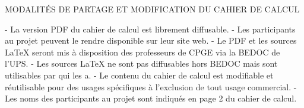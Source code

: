MODALITÉS DE PARTAGE ET MODIFICATION DU CAHIER DE CALCUL

- La version PDF du cahier de calcul est librement diffusable.
- Les participants au projet peuvent le rendre disponible sur leur site web.
- Le PDF et les sources LaTeX seront mis à disposition des professeurs de CPGE via la BEDOC de l'UPS.
- Les sources LaTeX ne sont pas diffusables hors BEDOC mais sont utilisables par qui les a.
- Le contenu du cahier de calcul est modifiable et réutilisable pour des usages spécifiques à l'exclusion de tout usage commercial.
- Les noms des participants au projet sont indiqués en page 2 du cahier de calcul.